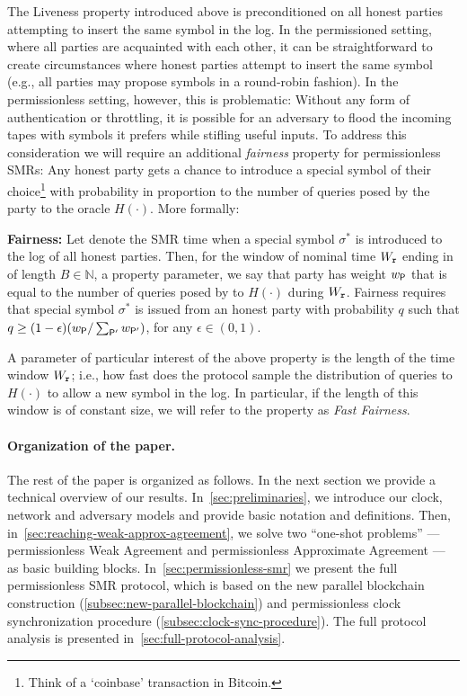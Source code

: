 The Liveness property introduced above is preconditioned on all honest parties attempting to insert the same symbol in the log.
%
In the permissioned setting, where all parties are acquainted with each other, it can be straightforward to create circumstances where honest parties attempt to insert the same symbol (e.g., all parties may propose symbols in a round-robin fashion).
%
In the permissionless setting, however, this is problematic:
%
Without any form of authentication or throttling, it is possible for an adversary to flood the incoming tapes with symbols it prefers while stifling useful inputs.
%
To address this consideration we will require an additional \emph{fairness} property for permissionless SMRs:
%
Any honest party gets a chance to introduce a special symbol of their choice\footnote{Think of a `coinbase' transaction in Bitcoin.} with probability
in proportion to the number of queries posed by the party to the  oracle $H(\cdot)$.
%
More formally:
%
\begin{cccItemize}[noitemsep]
    \item \textbf{Fairness:}
    Let \round denote the SMR time when a special symbol $\sigma^*$ is introduced to the log of all honest parties.
    Then, for the window of nominal time $W_\mathtt{r}$ ending in \round of length $B\in \mathbb{N}$, a property parameter, we say that party \party has weight $w_\mathsf{P}$ that is equal to the number of queries posed by \party to $H(\cdot)$ during $W_\mathtt{r}$.
    Fairness requires that special symbol $\sigma^*$ is issued from an honest party \party with probability $q$ such that  $q \ge (1 - \epsilon) (w_\mathsf{P} / \sum_{\mathsf{P}'} w_{\mathsf{P}'} )$, for any $\epsilon\in (0, 1)$.
\end{cccItemize}
%
A parameter of particular interest of the above property is the length of the time window $W_\mathtt{r}$; i.e., how fast does the protocol sample the distribution of queries to $H(\cdot)$ to allow a new symbol in the log.
%
In particular, if the length of this window is of constant size, we will refer to the property as \emph{Fast Fairness}.




\paragraph{Organization of the paper.}
%
The rest of the paper is organized as follows.
%
In the next section we provide a technical overview of our results.
%
In~\cref{sec:preliminaries}, we introduce our clock, network and adversary models and provide basic notation and definitions.
%
Then, in~\cref{sec:reaching-weak-approx-agreement}, we solve two ``one-shot problems'' --- permissionless Weak Agreement and permissionless Approximate Agreement --- as basic building blocks.
%
In~\cref{sec:permissionless-smr} we present the full permissionless SMR protocol, which is based on the new parallel blockchain construction (\cref{subsec:new-parallel-blockchain}) and permissionless clock synchronization procedure (\cref{subsec:clock-sync-procedure}).
%
The full protocol analysis is presented in~\cref{sec:full-protocol-analysis}.

